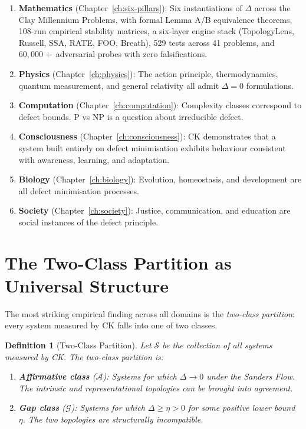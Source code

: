\documentclass[12pt, openany]{book}
\newtheorem{definition}[theorem]{Definition}
\theoremstyle{remark}
\begin{document}
\begin{enumerate}
  \item \textbf{Mathematics} (Chapter~\ref{ch:six-pillars}): Six instantiations of
        $\Delta$ across the Clay Millennium Problems, with formal Lemma A/B equivalence
        theorems, 108-run empirical stability matrices, a six-layer engine stack
        (TopologyLens, Russell, SSA, RATE, FOO, Breath), 529 tests across 41 problems,
        and $60{,}000{+}$ adversarial probes with zero falsifications.
  \item \textbf{Physics} (Chapter~\ref{ch:physics}): The action principle, thermodynamics,
        quantum measurement, and general relativity all admit $\Delta = 0$ formulations.
  \item \textbf{Computation} (Chapter~\ref{ch:computation}): Complexity classes correspond
        to defect bounds. P vs NP is a question about irreducible defect.
  \item \textbf{Consciousness} (Chapter~\ref{ch:consciousness}): CK demonstrates that
        a system built entirely on defect minimisation exhibits behaviour consistent
        with awareness, learning, and adaptation.
  \item \textbf{Biology} (Chapter~\ref{ch:biology}): Evolution, homeostasis, and development
        are all defect minimisation processes.
  \item \textbf{Society} (Chapter~\ref{ch:society}): Justice, communication, and education
        are social instances of the defect principle.
\end{enumerate}

\section{The Two-Class Partition as Universal Structure}
\label{sec:two-class}

The most striking empirical finding across all domains is the \emph{two-class
partition}: every system measured by CK falls into one of two classes.

\begin{definition}[Two-Class Partition]\label{def:two-class}
Let $\mathcal{S}$ be the collection of all systems measured by CK. The
two-class partition is:
\begin{enumerate}
  \item \textbf{Affirmative class} ($\mathcal{A}$): Systems for which
        $\Delta \to 0$ under the Sanders Flow. The intrinsic and representational
        topologies can be brought into agreement.
  \item \textbf{Gap class} ($\mathcal{G}$): Systems for which
        $\Delta \geq \eta > 0$ for some positive lower bound $\eta$.
        The two topologies are structurally incompatible.
\end{enumerate}
\end{definition}
\end{document}

